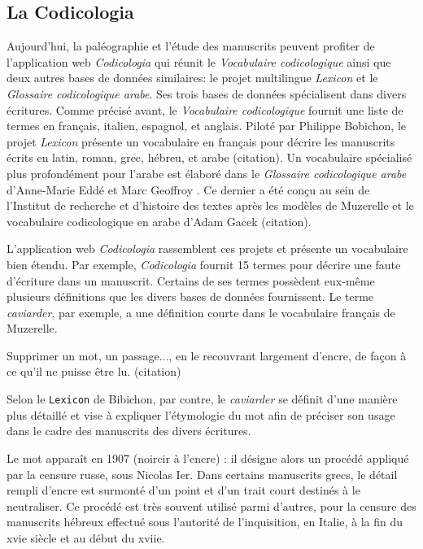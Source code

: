\documentclass[class=article, crop=false]{standalone}
\begin{document}
\subsection{La Codicologia}

Aujourd'hui, la paléographie et l'étude des manuscrits peuvent profiter de l'application web \textit{Codicologia} qui réunit le \textit{Vocabulaire codicologique} ainsi que deux autres bases de données similaires: le projet multilingue \textit{Lexicon} et le \textit{Glossaire codicologique arabe}. Ses trois bases de données spécialisent dans divers écritures. Comme précisé avant, le \textit{Vocabulaire codicologique} fournit une liste de termes en français, italien, espagnol, et anglais. Piloté par Philippe Bobichon, le projet \textit{Lexicon} présente un vocabulaire en français pour décrire les manuscrits écrits en latin, roman, grec, hébreu, et arabe (citation). Un vocabulaire spécialisé plus profondément pour l'arabe est élaboré dans le \textit{Glossaire codicologique arabe} d'Anne-Marie Eddé et Marc Geoffroy \cite{noauthor_glossaire_2002}. Ce dernier a été conçu au sein de l'Institut de recherche et d'histoire des textes après les modèles de Muzerelle et le vocabulaire codicologique en arabe d'Adam Gacek (citation).

L'application web \textit{Codicologia} rassemblent ces projets et présente un vocabulaire bien étendu. Par exemple, \textit{Codicologia} fournit 15 termes pour décrire une faute d'écriture dans un manuscrit. Certains de ses termes possèdent eux-même plusieurs définitions que les divers bases de données fournissent. Le terme \textit{caviarder}, par exemple, a une définition courte dans le vocabulaire français de Muzerelle. 

\begin{displayquote}
Supprimer un mot, un passage..., en le recouvrant largement d'encre, de façon à ce qu'il ne puisse être lu. (citation)
\end{displayquote}

\noindent Selon le \texttt{Lexicon} de Bibichon, par contre, le \textit{caviarder} se définit d'une manière plus détaillé et vise à expliquer l'étymologie du mot afin de préciser son usage dans le cadre des manuscrits des divers écritures.

\begin{displayquote}
Le mot apparaît en 1907 (noircir à l'encre) : il désigne alors un procédé appliqué par la censure russe, sous Nicolas Ier. Dans certains manuscrits grecs, le détail rempli d'encre est surmonté d'un point et d'un trait court destinés à le neutraliser. Ce procédé est très souvent utilisé parmi d'autres, pour la censure des manuscrits hébreux effectué sous l'autorité de l'inquisition, en Italie, à la fin du xvie siècle et au début du xviie. \cite{bobichon_caviarder_2011}


\end{displayquote}
\end{document}

